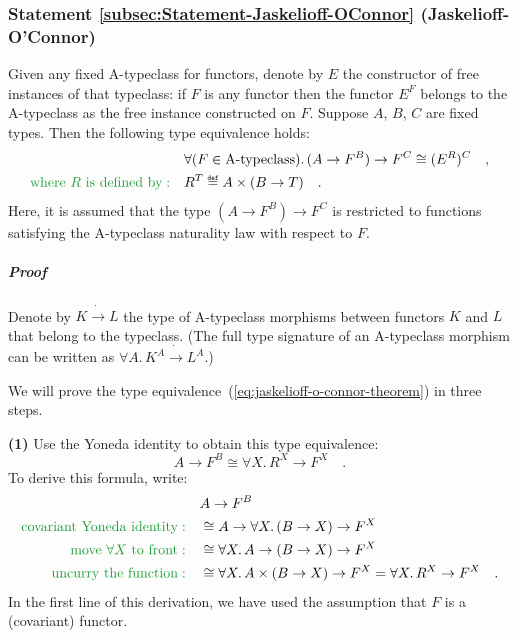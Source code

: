 \subsubsection{Statement \label{subsec:Statement-Jaskelioff-OConnor}\ref{subsec:Statement-Jaskelioff-OConnor}
(Jaskelioff-O\textsf{'}Connor)}

Given any fixed A-typeclass for functors, denote by $E$ the constructor
of free instances of that typeclass: if $F$ is any functor then the
functor $E^{F}$ belongs to the A-typeclass as the free instance constructed
on $F$. Suppose $A$, $B$, $C$ are fixed types. Then the following
type equivalence holds:
\begin{align}
 & \forall(F\in\text{A-typeclass}).\,(A\rightarrow F^{B})\rightarrow F^{C}\cong(E^{R})^{C}\quad,\label{eq:jaskelioff-o-connor-theorem}\\
{\color{greenunder}\text{where }R\text{ is defined by}:}\quad & R^{T}\triangleq A\times(B\rightarrow T)\quad.\nonumber 
\end{align}
Here, it is assumed that the type $(A\rightarrow F^{B})\rightarrow F^{C}$
is restricted to functions satisfying the A-typeclass naturality law
with respect to $F$.

\subparagraph{Proof}

Denote by $K\dot{\rightarrow}L$ the type of A-typeclass morphisms
between functors $K$ and $L$ that belong to the typeclass. (The
full type signature of an A-typeclass morphism can be written as $\forall A.\,K^{A}\dot{\rightarrow}L^{A}$.)

We will prove the type equivalence~(\ref{eq:jaskelioff-o-connor-theorem})
in three steps.

\textbf{(1)} Use the Yoneda identity to obtain this type equivalence:
\[
A\rightarrow F^{B}\cong\forall X.\,R^{X}\rightarrow F^{X}\quad.
\]
To derive this formula, write:
\begin{align*}
 & A\rightarrow F^{B}\\
{\color{greenunder}\text{covariant Yoneda identity}:}\quad & \cong A\rightarrow\forall X.\,(B\rightarrow X)\rightarrow F^{X}\\
{\color{greenunder}\text{move }\forall X\text{ to front}:}\quad & \cong\forall X.\,A\rightarrow(B\rightarrow X)\rightarrow F^{X}\\
{\color{greenunder}\text{uncurry the function}:}\quad & \cong\forall X.\,A\times(B\rightarrow X)\rightarrow F^{X}=\forall X.\,R^{X}\rightarrow F^{X}\quad.
\end{align*}
In the first line of this derivation, we have used the assumption
that $F$ is a (covariant) functor.


